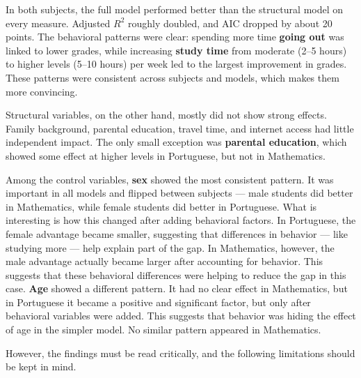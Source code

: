 \documentclass{article}
\begin{document}
\vspace{0.2em}
In both subjects, the full model performed better than the structural model on every measure. Adjusted $R^2$ roughly doubled, and AIC dropped by about 20 points. The behavioral patterns were clear: spending more time \textbf{going out} was linked to lower grades, while increasing \textbf{study time} from moderate (2--5 hours) to higher levels (5--10 hours) per week led to the largest improvement in grades. These patterns were consistent across subjects and models, which makes them more convincing.

\vspace{0.2em}
Structural variables, on the other hand, mostly did not show strong effects. Family background, parental education, travel time, and internet access had little independent impact. The only small exception was \textbf{parental education}, which showed some effect at higher levels in Portuguese, but not in Mathematics.

\vspace{0.2em}
Among the control variables, \textbf{sex} showed the most consistent pattern. It was important in all models and flipped between subjects --- male students did better in Mathematics, while female students did better in Portuguese. What is interesting is how this changed after adding behavioral factors. In Portuguese, the female advantage became smaller, suggesting that differences in behavior --- like studying more --- help explain part of the gap. In Mathematics, however, the male advantage actually became larger after accounting for behavior. This suggests that these behavioral differences were helping to reduce the gap in this case. \textbf{Age} showed a different pattern. It had no clear effect in Mathematics, but in Portuguese it became a positive and significant factor, but only after behavioral variables were added. This suggests that behavior was hiding the effect of age in the simpler model. No similar pattern appeared in Mathematics.

\vspace{0.2em}
However, the findings must be read critically, and the following limitations should be kept in mind.
\end{document}
